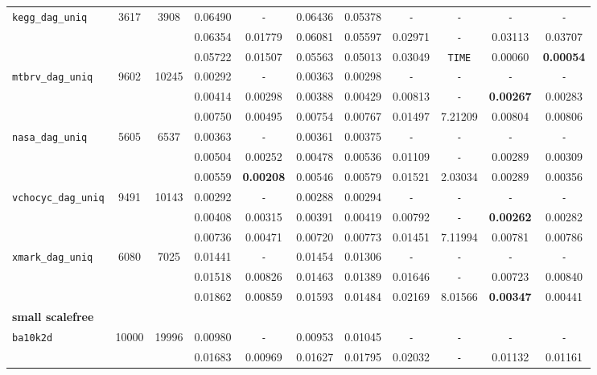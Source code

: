 \begin{table}
{\begin{tabular}{ l c c | c c c c c c c c }
\hline
\verb|kegg_dag_uniq| & 3617 & 3908 & 0.06490 & \verb|-| & 0.06436 & 0.05378 & \verb|-| & \verb|-| & \verb|-| & \verb|-| \\
 &  &  & 0.06354 & 0.01779 & 0.06081 & 0.05597 & 0.02971 & \verb|-| & 0.03113 & 0.03707 \\
 &  &  & 0.05722 & 0.01507 & 0.05563 & 0.05013 & 0.03049 & \verb|TIME| & 0.00060 & \textbf{0.00054} \\
\hline
\verb|mtbrv_dag_uniq| & 9602 & 10245 & 0.00292 & \verb|-| & 0.00363 & 0.00298 & \verb|-| & \verb|-| & \verb|-| & \verb|-| \\
 &  &  & 0.00414 & 0.00298 & 0.00388 & 0.00429 & 0.00813 & \verb|-| & \textbf{0.00267} & 0.00283 \\
 &  &  & 0.00750 & 0.00495 & 0.00754 & 0.00767 & 0.01497 & 7.21209 & 0.00804 & 0.00806 \\
\hline
\verb|nasa_dag_uniq| & 5605 & 6537 & 0.00363 & \verb|-| & 0.00361 & 0.00375 & \verb|-| & \verb|-| & \verb|-| & \verb|-| \\
 &  &  & 0.00504 & 0.00252 & 0.00478 & 0.00536 & 0.01109 & \verb|-| & 0.00289 & 0.00309 \\
 &  &  & 0.00559 & \textbf{0.00208} & 0.00546 & 0.00579 & 0.01521 & 2.03034 & 0.00289 & 0.00356 \\
\hline
\verb|vchocyc_dag_uniq| & 9491 & 10143 & 0.00292 & \verb|-| & 0.00288 & 0.00294 & \verb|-| & \verb|-| & \verb|-| & \verb|-| \\
 &  &  & 0.00408 & 0.00315 & 0.00391 & 0.00419 & 0.00792 & \verb|-| & \textbf{0.00262} & 0.00282 \\
 &  &  & 0.00736 & 0.00471 & 0.00720 & 0.00773 & 0.01451 & 7.11994 & 0.00781 & 0.00786 \\
\hline
\verb|xmark_dag_uniq| & 6080 & 7025 & 0.01441 & \verb|-| & 0.01454 & 0.01306 & \verb|-| & \verb|-| & \verb|-| & \verb|-| \\
 &  &  & 0.01518 & 0.00826 & 0.01463 & 0.01389 & 0.01646 & \verb|-| & 0.00723 & 0.00840 \\
 &  &  & 0.01862 & 0.00859 & 0.01593 & 0.01484 & 0.02169 & 8.01566 & \textbf{0.00347} & 0.00441 \\
\hline
\multicolumn{11}{l}{\textbf{small scalefree}} \\
\hline
\verb|ba10k2d| & 10000 & 19996 & 0.00980 & \verb|-| & 0.00953 & 0.01045 & \verb|-| & \verb|-| & \verb|-| & \verb|-| \\
 &  &  & 0.01683 & 0.00969 & 0.01627 & 0.01795 & 0.02032 & \verb|-| & 0.01132 & 0.01161 \\

\end{tabular}}
\end{table}
